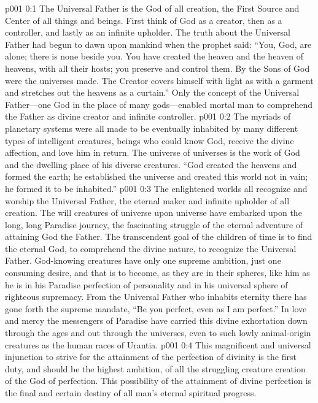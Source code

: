 \author{Divine Counselor}
\vs p001 0:1 The Universal Father is the God of all creation, the First Source and Center of all things and beings. First think of God as a creator, then as a controller, and lastly as an infinite upholder. The truth about the Universal Father had begun to dawn upon mankind when the prophet said: “You, God, are alone; there is none beside you. You have created the heaven and the heaven of heavens, with all their hosts; you preserve and control them. By the Sons of God were the universes made. The Creator covers himself with light as with a garment and stretches out the heavens as a curtain.” Only the concept of the Universal Father---one God in the place of many gods---enabled mortal man to comprehend the Father as divine creator and infinite controller.
\vs p001 0:2 The myriads of planetary systems were all made to be eventually inhabited by many different types of intelligent creatures, beings who could know God, receive the divine affection, and love him in return. The universe of universes is the work of God and the dwelling place of his diverse creatures. “God created the heavens and formed the earth; he established the universe and created this world not in vain; he formed it to be inhabited.”
\vs p001 0:3 The enlightened worlds all recognize and worship the Universal Father, the eternal maker and infinite upholder of all creation. The will creatures of universe upon universe have embarked upon the long, long Paradise journey, the fascinating struggle of the eternal adventure of attaining God the Father. The transcendent goal of the children of time is to find the eternal God, to comprehend the divine nature, to recognize the Universal Father. God\hyp{}knowing creatures have only one supreme ambition, just one consuming desire, and that is to become, as they are in their spheres, like him as he is in his Paradise perfection of personality and in his universal sphere of righteous supremacy. From the Universal Father who inhabits eternity there has gone forth the supreme mandate, “Be you perfect, even as I am perfect.” In love and mercy the messengers of Paradise have carried this divine exhortation down through the ages and out through the universes, even to such lowly animal\hyp{}origin creatures as the human races of Urantia.
\vs p001 0:4 This magnificent and universal injunction to strive for the attainment of the perfection of divinity is the first duty, and should be the highest ambition, of all the struggling creature creation of the God of perfection. This possibility of the attainment of divine perfection is the final and certain destiny of all man’s eternal spiritual progress.
